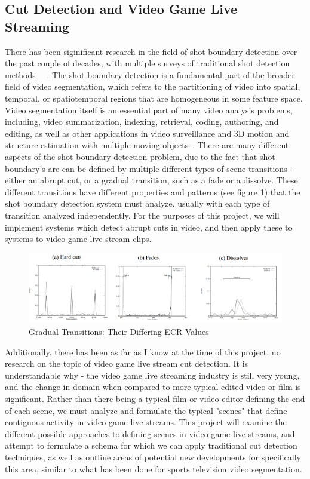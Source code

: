\documentclass[12pt]{article}
\begin{document}
\subsection{Cut Detection and Video Game Live Streaming}
    There has been siginificant research in the field of shot boundary detection over the past couple of decades, with multiple surveys of traditional shot detection methods
~\cite{lienhart1998comparison}~\cite{survey1}. The shot boundary detection is a fundamental part of the broader field of video segmentation, which refers to the partitioning 
of video into spatial, temporal, or spatiotemporal regions that are homogeneous in some feature space. Video segmentation itself is an essential part of many video analysis problems,
including, video summarization, indexing, retrieval, coding, authoring, and editing, as well as other applications in video surveillance and 3D motion and structure estimation with multiple
moving objects~\cite{bovik2009essential}. There are many different aspects of the shot boundary detection problem, due to the fact that shot boundary's are can be defined by multiple 
different types of scene transitions - either an abrupt cut, or a gradual transition, such as a fade or a dissolve. These different transitions have different properties and patterns 
(see figure 1) that the shot boundary detection system must analyze, usually with each type of transition analyzed independently. For the purposes of this project, we will implement
systems which detect abrupt cuts in video, and then apply these to systems to video game live stream clips.
\begin{figure}[ht]
    \centering
    \includegraphics[width=1.0\textwidth]{fig1}
    \caption{Gradual Transitions: Their Differing ECR Values~\cite{lienhart1998comparison}}
    \label{Gradual Transitions}
\end{figure}

    Additionally, there has been as far as I know at the time of this project, no research on the topic of video game live stream cut detection. It is understandable why - the 
video game live streaming industry is still very young, and the change in domain when compared to more typical edited video or film is significant. Rather than there being a typical 
film or video editor defining the end of each scene, we must analyze and formulate the typical "scenes" that define contiguous activity in video game live streams. 
This project will examine the different possible approaches to defining scenes in video game live streams, and attempt to formulate a schema for which we can apply 
traditional cut detection techniques, as well as outline areas of potential new developments for specifically this area, similar to what has been done for sports television
video segmentation.
\clearpage
\end{document}
